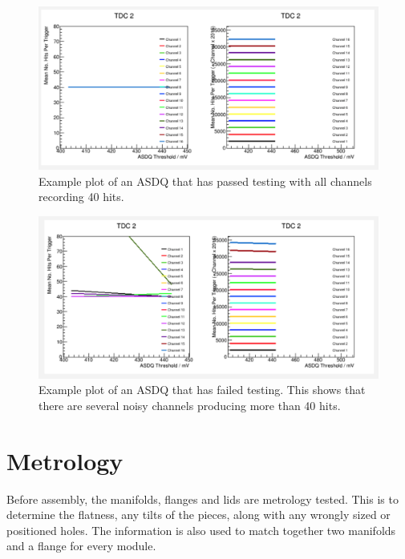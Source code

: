 \newpage
\vfill
\begin{figure}[th]
\centering
\includegraphics[scale=0.5]{Figures/asdq_testing1}
\decoRule
\caption{Example plot of an ASDQ that has passed testing with all channels recording 40 hits.}
\label{fig:asdq_testing1}
\end{figure}

\begin{figure}[th]
\centering
\includegraphics[scale=0.5]{Figures/asdq_testing2}
\decoRule
\caption{Example plot of an ASDQ that has failed testing. This shows that there are several noisy channels producing more than 40 hits.}
\label{fig:asdq_testing2}
\end{figure}
\vfill
\clearpage

\section{Metrology}

Before assembly, the manifolds, flanges and lids are metrology tested. This is to determine the flatness, any tilts of the pieces, along with any wrongly sized or positioned holes. The information is also used to match together two manifolds and a flange for every module. 

